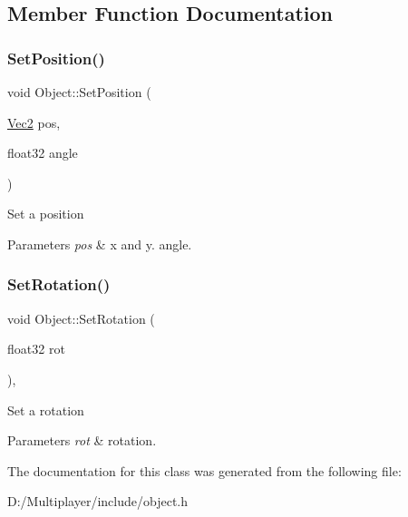 \subsection{Member Function Documentation}
\mbox{\label{class_object_a988d9f95eabf06b573b55ad9bce044f6}} 
\subsubsection{\texorpdfstring{Set\+Position()}{SetPosition()}}
{\footnotesize\ttfamily void Object\+::\+Set\+Position (\begin{DoxyParamCaption}\item[{\hyperlink{struct_vec2}{Vec2}}]{pos,  }\item[{float32}]{angle }\end{DoxyParamCaption})\hspace{0.3cm}{\ttfamily [protected]}}

Set a position 
\begin{DoxyParams}{Parameters}
{\em pos} & x and y.  angle. \\
\hline
\end{DoxyParams}
\mbox{\label{class_object_a9d94650613651d0f08c27e5ba64cef8f}} 
\subsubsection{\texorpdfstring{Set\+Rotation()}{SetRotation()}}
{\footnotesize\ttfamily void Object\+::\+Set\+Rotation (\begin{DoxyParamCaption}\item[{float32}]{rot }\end{DoxyParamCaption})\hspace{0.3cm}{\ttfamily [inline]}, {\ttfamily [protected]}}

Set a rotation 
\begin{DoxyParams}{Parameters}
{\em rot} & rotation. \\
\hline
\end{DoxyParams}


The documentation for this class was generated from the following file\+:\begin{DoxyCompactItemize}
\item 
D\+:/\+Multiplayer/include/object.\+h\end{DoxyCompactItemize}

